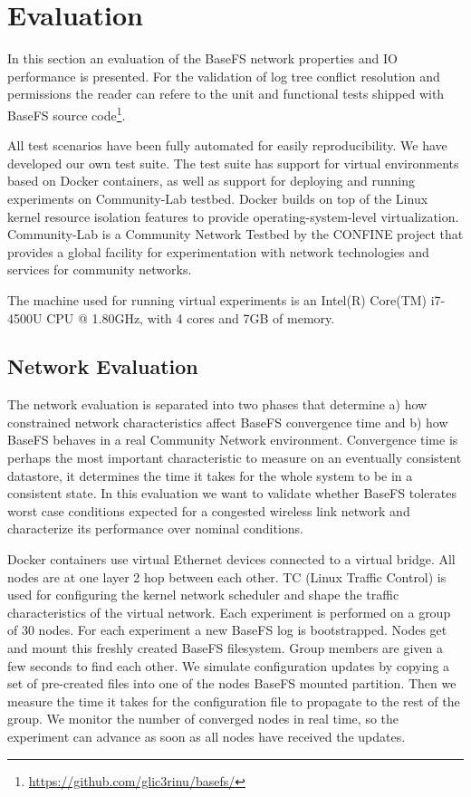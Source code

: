 \documentclass{sig-alternate}
\begin{document}
\section{Evaluation} \label{evaluation}

In this section an evaluation of the BaseFS network properties and IO performance is presented. For the validation of log tree conflict resolution and permissions the reader can refere to the unit and functional tests shipped with BaseFS source code\footnote{\url{https://github.com/glic3rinu/basefs/}}.

All test scenarios have been fully automated for easily reproducibility. We have developed our own test suite. The test suite has support for virtual environments based on Docker containers, as well as support for deploying and running experiments on Community-Lab testbed\cite{selimi2014cloud}. Docker builds on top of the Linux kernel resource isolation features to provide operating-system-level virtualization. Community-Lab is a Community Network Testbed by the CONFINE project that provides a global facility for experimentation with network technologies and services for community networks. 

The machine used for running virtual experiments is an Intel(R) Core(TM) i7-4500U CPU @ 1.80GHz, with 4 cores and 7GB of memory.


\subsection{Network Evaluation}
The network evaluation is separated into two phases that determine a) how constrained network characteristics affect BaseFS convergence time and b) how BaseFS behaves in a real Community Network environment. Convergence time is perhaps the most important characteristic to measure on an eventually consistent datastore, it determines the time it takes for the whole system to be in a consistent state. In this evaluation we want to validate whether BaseFS tolerates worst case conditions expected for a congested wireless link network and characterize its performance over nominal conditions.

Docker containers use virtual Ethernet devices connected to a virtual bridge. All nodes are at one layer 2 hop between each other. TC (Linux Traffic Control) is used for configuring the kernel network scheduler and shape the traffic characteristics of the virtual network. Each experiment is performed on a group of 30 nodes. For each experiment a new BaseFS log is bootstrapped. Nodes get and mount this freshly created BaseFS filesystem. Group members are given a few seconds to find each other. We simulate configuration updates by copying a set of pre-created files into one of the nodes BaseFS mounted partition. Then we measure the time it takes for the configuration file to propagate to the rest of the group. We monitor the number of converged nodes in real time, so the experiment can advance as soon as all nodes have received the updates.
\end{document}
